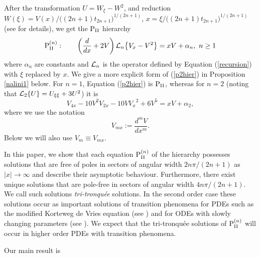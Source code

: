 \documentclass{amsart}
\theoremstyle{definition}
\theoremstyle{remark}
\theoremstyle{remark}
\begin{document}
After the transformation $U=W_{\xi}-W^{2}$, and reduction
$W(\xi)=V(x)/\bigl((2n+1)t_{2n+1}\bigr)^{1/(2n+1)}$,
$x=\xi/\bigl((2n+1)t_{2n+1}\bigr)^{1/(2n+1)}$ (see \cite{cjp} for
details), we get the ${\rm P}_{\rm{\scriptstyle II}}$ hierarchy
\begin{equation}
\label{p2hier}
{\rm P}^{(n)}_{\rm{\scriptstyle II}} :\quad\quad \left(\frac{d}{dx}+2 V\right){\mathcal L}_{n}\bigl\{V_{x}-V^{2}\bigr\}
=x V+\alpha_{n},\ n\ge 1
    \end{equation}
where $\alpha_{n}$ are constants and ${\mathcal L}_{n}$ is the operator defined by
Equation (\ref{recursion})
with $\xi$ replaced by $x$. We give a more explicit form of
(\ref{p2hier}) in Proposition \ref{nalini1} below. For $n=1$, Equation
(\ref{p2hier}) is ${\rm P}_{\rm{\scriptstyle II}}$, whereas for $n=2$ (noting that
${\mathcal L}_{2}\{U\}=U_{\xi\xi}+3U^{2}$) it is
\begin{equation}
 \label{p24}
 V_{4x}-10 V^{2}V_{2x}-10V{V_{x}}^{2}+6V^{5}= x V+\alpha_{2},
 \end{equation}
where we use the notation
\[V_{mx}:=\frac{d^{m} V}{dx^{m}}.\]
Below we will also use $V_m\equiv V_{mx}$.

In this paper, we show that each equation ${\rm P}^{(n)}_{\rm{\scriptstyle II}}$ of the
hierarchy possesses solutions
that are free of poles in sectors of angular width $2n\pi/(2n+1)$
as $|x|\to\infty$ and describe their asymptotic behaviour.
Furthermore, there exist unique solutions that are pole-free in
sectors of angular width $4 n\pi/(2n+1)$. We call such solutions
{\em tri-tronqu\'ee} solutions. %
In the second order case these solutions occur as important
solutions of transition phenomena for PDEs such as the modified
Korteweg de Vries equation (see \cite{Hab1}) and for ODEs with slowly
changing parameters (see \cite{Hab2}). We expect that the tri-tronqu\'ee
solutions of ${\rm P}^{(n)}_{\rm{\scriptstyle II}}$
will occur in higher order PDEs with transition phenomena.

Our main result is
\end{document}
